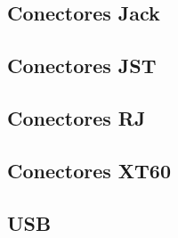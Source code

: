 
\subsection{Conectores Jack}


\subsection{Conectores JST}


\subsection{Conectores RJ}


\subsection{Conectores XT60}


\subsection{USB}
